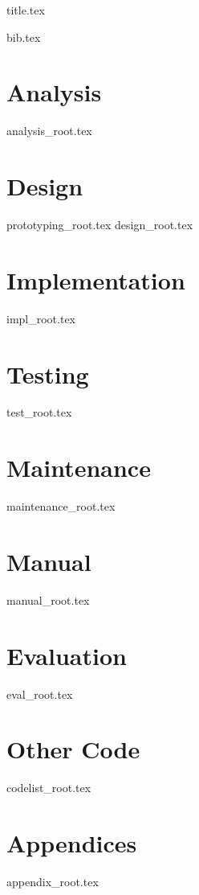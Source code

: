 \documentclass[a4paper, 12pt]{scrartcl}
\begin{document}
{title.tex}

\begin{footnotesize}
\tableofcontents
\end{footnotesize}

{bib.tex}
\pagebreak

\section{Analysis}
{analysis_root.tex}
\pagebreak

\section{Design}
{prototyping_root.tex}
{design_root.tex}
\pagebreak

\section{Implementation}
{impl_root.tex}
\pagebreak

\section{Testing}
{test_root.tex}
\pagebreak

\section{Maintenance}
{maintenance_root.tex}
\pagebreak

\section{Manual}
{manual_root.tex}
\pagebreak

\section{Evaluation}
{eval_root.tex}
\pagebreak

\section{Other Code}
{codelist_root.tex}
\pagebreak

\appendix
\section*{Appendices}
\renewcommand{\thesubsection}{\Alph{subsection}}
{appendix_root.tex}
\pagebreak
\end{document}
